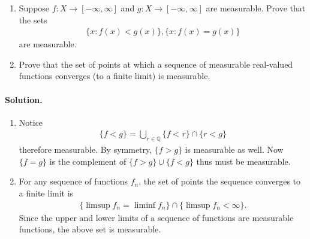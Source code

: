 \documentclass[../main.tex]{subfiles}
\begin{document}
\begin{exercise}
  \begin{enumerate}
    \item Suppose $ f: X \to [-\infty, \infty] $ and $ g: X \to [-\infty, \infty] $ are measurable. Prove that the sets
    \begin{align*}
      \{x: f(x) < g(x) \}, \{x: f(x) = g(x) \}
    \end{align*}
    are measurable.

    \item Prove that the set of points at which a sequence of measurable real-valued functions converges (to a finite limit) is measurable.

  \end{enumerate}

  \paragraph{Solution. }
  \begin{enumerate}
    \item Notice
    \begin{align*}
      \{f < g\} = \bigcup _{r \in \mathbb Q} \{f < r\} \cap \{r < g\}
    \end{align*}
    therefore measurable. By symmetry, $ \{f > g\} $ is measurable as well. Now $ \{f = g\} $ is the complement of $ \{f > g\} \cup \{f < g\} $ thus must be measurable.

    \item For any sequence of functions $ f_n $, the set of points the sequence converges to a finite limit is
    \begin{align*}
      \{\limsup f_n = \liminf f_n \} \cap \{\limsup f_n < \infty \}.
    \end{align*}
    Since the upper and lower limits of a sequence of functions are measurable functions, the above set is measurable.
  \end{enumerate}

\end{exercise}
\end{document}
